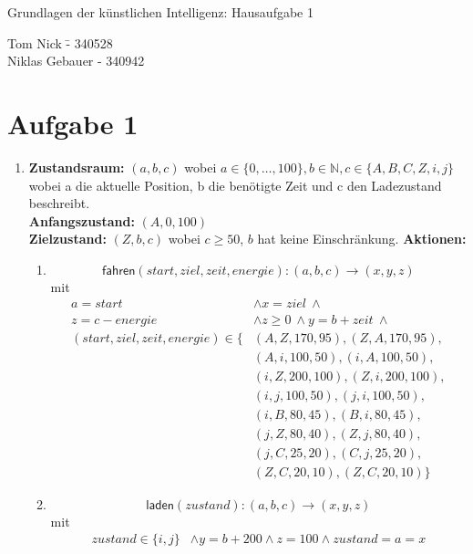 \documentclass[a4paper,10pt]{article}
\newcommand{\N}{\mathbb{N}}
\begin{document}
\begin{center}
\Large{Grundlagen der künstlichen Intelligenz: Hausaufgabe 1} \\
\end{center}
\begin{tabbing}
Tom Nick \hspace{2cm}\= - 340528\\
Niklas Gebauer \> - 340942 \\
\end{tabbing}

\section*{Aufgabe 1}

\begin{enumerate}[~~a)]
	\item
	\textbf{Zustandsraum:} 
	$(a, b, c)$ wobei $ a \in \{0,\dots,100\}, b \in \N, c \in \{A, B, C, Z, i, j\} $ \\
	wobei a die aktuelle Position, b die benötigte Zeit und c den Ladezustand beschreibt. \\
	\textbf{Anfangszustand:}
	$(A,0,100)$ \\
	\textbf{Zielzustand:}
	$(Z,b,c)$ wobei $c \ge 50$, $b$ hat keine Einschränkung.
	\textbf{Aktionen:}
	\begin{enumerate}[~~1.]
	\item $$\textsf{fahren}(start, ziel, zeit, energie): (a, b, c) \rightarrow (x, y, z)$$ 
	mit 
	\begin{align*}
		a = start &\land x = ziel ~\land \\
		z = c - energie  &\land z \ge 0 ~\land y = b + zeit ~\land\\
		(start, ziel, zeit, energie)  \in \{&(A, Z, 170, 95), (Z, A, 170, 95),\\
		&(A,i,100,50), (i,A,100,50),\\
		&(i,Z,200,100), (Z,i,200,100),\\
		&(i,j,100,50), (j,i,100,50),\\
		&(i,B,80,45), (B,i,80,45),\\
		&(j,Z,80,40), (Z,j,80,40),\\
		&(j,C,25,20), (C,j,25,20),\\
		&(Z,C,20,10), (Z,C,20,10)\}
	\end{align*}
	\item $$\textsf{laden}(zustand): (a, b, c) \rightarrow (x, y, z)$$ 
	mit 
	\begin{align*}
		zustand \in \{ i, j \} &\land y = b + 200 \land z = 100 \land zustand = a = x
	\end{align*}
	\end{enumerate}


\end{enumerate}
\end{document}
